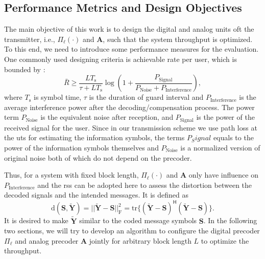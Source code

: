 \documentclass[12pt,draftclsnofoot,onecolumn,journal]{IEEEtran}
\newcommand{\brc}[1]{ \left( #1 \right) }
\begin{document}
\subsection{Performance Metrics and Design Objectives}
The main objective of this work is to design the digital and analog units oft the transmitter, i.e., $\Pi_\ell\brc{\cdot}$ and $\mathbf{A}$, such that the system throughput is optimized. To this end, we need to introduce some performance measures for the evaluation. One commonly used designing criteria is achievable rate per user, which is bounded by \cite{sedaghat2017novel}:
\begin{equation}
\bar R\geq \frac{LT_{\mathrm{s}}}{\tau+LT_{\mathrm{s}}}\log\left(1+\frac{P_{\mathrm{Signal}}}{P_{\mathrm{Noise}}+P_{\mathrm{Interference}}}\right),
\end{equation}
where $T_{\mathrm{s}}$ is symbol time, $\tau$ is the duration of guard interval and $P_{\mathrm{Interference}}$ is the average interference power after the decoding/compensation process. The power term $P_{\mathrm{Noise}}$ is the equivalent noise after reception, and $P_{\mathrm{Signal}}$ is the power of the received signal for the user. Since in our transmission scheme we use path loss at the \acp{ut} for estimating the information symbols, the terms $P_Signal$ equals to the power of the information symbols themselves and $P_{\mathrm{Noise}}$ is a normalized version of original noise both of which do not depend on the precoder.

Thus, for a system with fixed block length, $\Pi_\ell\brc{\cdot}$ and $\mathbf{A}$ only have influence on $P_{\mathrm{Interference}}$ and the \ac{rss} can be adopted here to assess the distortion between the decoded signals and the intended messages. It is defined as
\begin{equation}
\mathrm d(\mathbf S, \tilde{\mathbf Y})=||\tilde{\mathbf Y}-\mathbf S||_{\mathrm{F}}^2=\mathrm{tr}\{(\tilde{\mathbf Y}-\mathbf S)^{\mathsf H}(\tilde{\mathbf Y}-\mathbf S)\}.
\label{eq:distancegeneral}
\end{equation}
 It is desired to make $\tilde{\mathbf Y}$ similar to the coded message symbols $\mathbf S$. In the following two sections, we will try to develop an algorithm to configure the digital precoder $\Pi_\ell$ and analog precoder $\mathbf A$ jointly for arbitrary block length $L$ to optimize the throughput.
\end{document}
